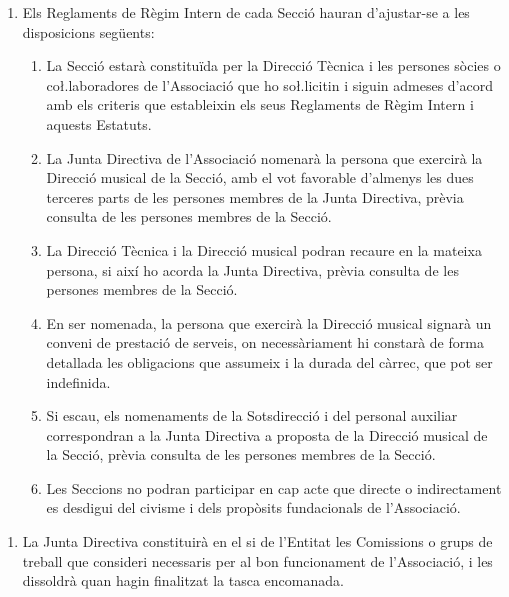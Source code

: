 \documentclass[11pt,a4paper]{article}
\newcommand{\JD}{Junta Directiva\xspace}
\newcommand{\DT}{Direcció Tècnica\xspace}
\DeclareRobustCommand{\RRIs}{Reglaments de Règim Intern\xspace}
\begin{document}
\Art{Els \RRIs}

\begin{enumerate}
    \item[] Els \RRIs de cada Secció hauran d'ajustar-se a les disposicions següents: \label{seccions:ajustar-disp}
    \begin{enumerate}
        \item La Secció estarà constituïda per la \DT i les persones sòcies o co\l.laboradores de l'Associació que ho so\l.licitin i siguin admeses d'acord amb els criteris que estableixin els seus \RRIs i aquests Estatuts.
        \item La \JD de l'Associació nomenarà la persona que exercirà la Direcció musical de la Secció, amb el vot favorable d'almenys les dues terceres parts de les persones membres de la \JD, prèvia consulta de les persones membres de la Secció.
        \item La \DT i la Direcció musical podran recaure en la mateixa persona, si així ho acorda la \JD, prèvia consulta de les persones membres de la Secció.
        \item En ser nomenada, la persona que exercirà la Direcció musical signarà un conveni de prestació de serveis, on necessàriament hi constarà de forma detallada les obligacions que assumeix i la durada del càrrec, que pot ser indefinida.
        \item Si escau, els nomenaments de la Sotsdirecció i del personal auxiliar correspondran a la \JD a proposta de la Direcció musical de la Secció, prèvia consulta de les persones membres de la Secció.
        \item Les Seccions no podran participar en cap acte que directe o indirectament es desdigui del civisme i dels propòsits fundacionals de l'Associació.
    \end{enumerate}
\end{enumerate}



\begin{enumerate}
    \item[] La \JD constituirà en el si de l'Entitat les Comissions o grups de treball que consideri necessaris per al bon funcionament de l'Associació, i les dissoldrà quan hagin finalitzat la tasca encomanada.
\end{enumerate}


\end{document}
